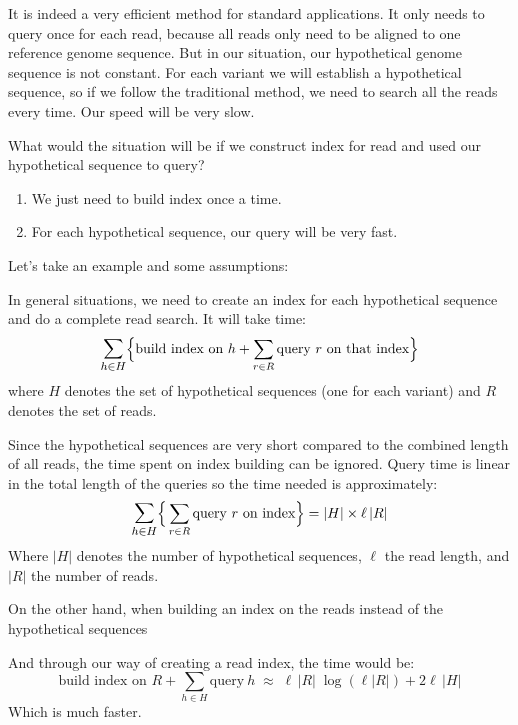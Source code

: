 It is indeed a very efficient method for standard applications. It only needs to query once for each read, because all reads only need to be aligned to one reference genome sequence. But in our situation, our hypothetical genome sequence is not constant. For each variant we will establish a hypothetical sequence, so if we follow the traditional method, we need to search all the reads every time. Our speed will be very slow.

What would the situation will be if we construct index for read and used our hypothetical sequence to query?
\begin{enumerate}
\itemsep=0em
\item We just need to build index once a time.
\item For each hypothetical sequence, our query will be very fast.
\end{enumerate}


\noindent Let's take an example and some assumptions:


In general situations, we need to create an index for each hypothetical sequence and do a complete read search. It will take time:
\begin{equation*}
\mathlarger{\sum_{h\in H}} \Big\{ \text{build index on } h + \sum_{r\in R}\text{query}~r~\text{on that index} \Big\}
\end{equation*}
where $H$ denotes the set of hypothetical sequences (one for each variant) and $R$ denotes the set of reads.

\begin{flushleft}
Since the hypothetical sequences are very short compared to the combined length of all reads, the time spent on index building can be ignored.  Query time is linear in the total length of the queries so the time needed is approximately:
\begin{equation*}
\mathlarger{\sum_{h\in H}} \Big\{ \sum_{r\in R}\text{query}~r~\text{on index} \Big\} = |H| \times \ell\,|R|
\end{equation*}
Where $|H|$ denotes the number of hypothetical sequences, $\ell$ the read length, and $|R|$ the number of reads.

On the other hand, when building an index on the reads instead of the hypothetical sequences

And through our way of creating a read index, the time would be:
\begin{equation*}
\text{build index on } R + \sum_{h\in H} \text{query}~h \; \approx \; \ell\,|R|\; \log( \ell|R| ) + 2 \ell\,|H|
\end{equation*}
Which is much faster.
\end{flushleft}

